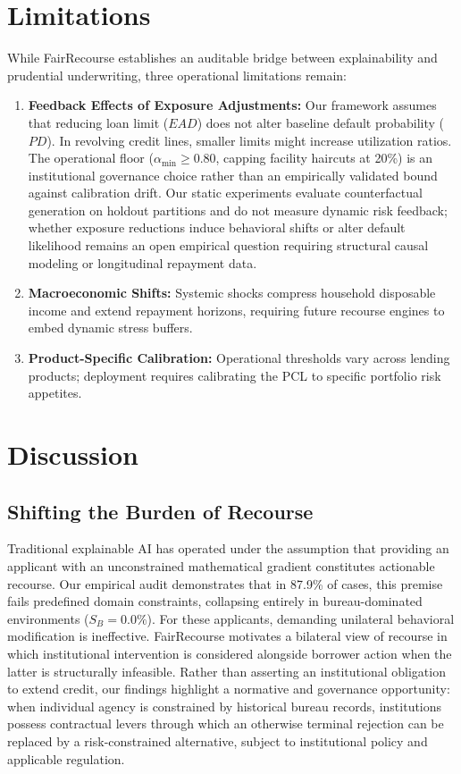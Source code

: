 \documentclass[manuscript,screen,review,anonymous]{acmart}
\begin{document}
\section{Limitations}
\label{sec:limitations}
While FairRecourse establishes an auditable bridge between explainability and prudential underwriting, three operational limitations remain:
\begin{enumerate}
    \item \textbf{Feedback Effects of Exposure Adjustments:} Our framework assumes that reducing loan limit ($EAD$) does not alter baseline default probability ($PD$). In revolving credit lines, smaller limits might increase utilization ratios. The operational floor ($\alpha_{\min} \ge 0.80$, capping facility haircuts at 20\%) is an institutional governance choice rather than an empirically validated bound against calibration drift. Our static experiments evaluate counterfactual generation on holdout partitions and do not measure dynamic risk feedback; whether exposure reductions induce behavioral shifts or alter default likelihood remains an open empirical question requiring structural causal modeling or longitudinal repayment data.
    \item \textbf{Macroeconomic Shifts:} Systemic shocks compress household disposable income and extend repayment horizons, requiring future recourse engines to embed dynamic stress buffers.
    \item \textbf{Product-Specific Calibration:} Operational thresholds vary across lending products; deployment requires calibrating the PCL to specific portfolio risk appetites.
\end{enumerate}

\section{Discussion}

\subsection{Shifting the Burden of Recourse}
Traditional explainable AI has operated under the assumption that providing an applicant with an unconstrained mathematical gradient constitutes actionable recourse. Our empirical audit demonstrates that in 87.9\% of cases, this premise fails predefined domain constraints, collapsing entirely in bureau-dominated environments ($S_B = 0.0\%$). For these applicants, demanding unilateral behavioral modification is ineffective. FairRecourse motivates a bilateral view of recourse in which institutional intervention is considered alongside borrower action when the latter is structurally infeasible. Rather than asserting an institutional obligation to extend credit, our findings highlight a normative and governance opportunity: when individual agency is constrained by historical bureau records, institutions possess contractual levers through which an otherwise terminal rejection can be replaced by a risk-constrained alternative, subject to institutional policy and applicable regulation.
\end{document}
